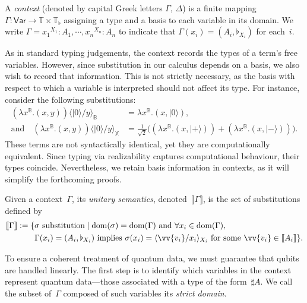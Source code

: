 \documentclass[runningheads,orivec,envcountsame,envcountsect]{llncs}
\newcommand\ket[1]{\ensuremath{|#1\rangle}}
\newcommand\Var{\ensuremath{\mathsf{Var}}}
\newcommand\ansubst[2]{\ensuremath{\langle #1 \rangle_{#2}}}
\newcommand\dom[1]{\mathrm{dom}(#1)}
\def\Pair#1#2{(#1,#2)} %
\def\Lam#1#2#3{\lambda#1^{#2}{.}#3} %
\def\Type{\mathbb{T}}
\def\BasisType{\Type_\flat}
\def\sem#1{\llbracket#1\rrbracket}
\newcommand\B{\mathbb B}
\newcommand\XB{\mathbb X}
\newcommand\basis[1]{\ensuremath{\flat_{#1}}}
\begin{document}
\begin{definition}
  A \emph{context} (denoted by capital Greek letters $\Gamma$, $\Delta$) is a
  finite mapping $\Gamma:\Var\to\Type\times\BasisType$ assigning a type and a
  basis to each variable in its domain. We write
  \(
    \Gamma = {x_1}^{{X_1}}:A_1,\dotsb, {x_n}^{{X_n}}:A_n
  \)
  to indicate that $\Gamma(x_i)=(A_i,\basis{X_i})$ for each~$i$.
\end{definition}

As in standard typing judgements, the context records the types of a term's
free variables. However, since substitution in our calculus depends on a basis,
we also wish to record that information. This is not strictly necessary, as the
basis with respect to which a variable is interpreted should not affect its
type. For instance, consider the following substitutions:
\begin{align*}
(\Lam{x}{\B}{\Pair{x}{y}})\ansubst{\ket{0}/y}{\B}
  &= \Lam{x}{\B}{\Pair{x}{\ket{0}}},\\
\text{and}\quad
(\Lam{x}{\B}{(x, y)})\ansubst{\ket{0}/y}{\XB}
  &= \tfrac{1}{\sqrt{2}}
    \bigl((\Lam{x}{\B}{\Pair{x}{\ket{+}}})
         + (\Lam{x}{\B}{\Pair{x}{\ket{-}}})\bigr).
\end{align*}
These terms are not syntactically identical, yet they are computationally
equivalent. 
Since typing via realizability captures computational behaviour,
their types coincide. Nevertheless, we retain basis information in contexts, as
it will simplify the forthcoming proofs.

\begin{definition}
  Given a context~$\Gamma$, its \emph{unitary semantics},
  denoted~$\sem{\Gamma}$, is the set of substitutions defined by
  \begin{align*}
    \sem{\Gamma}
    := 
    \{&\sigma~\text{substitution} \mid 
      \dom{\sigma} = \dom{\Gamma}
      \text{ and } \forall {x_i} \in \dom{\Gamma},\\
      &\Gamma(x_i) = (A_i, \basis{X_i})
      \text{ implies }
      \sigma(x_i) = \ansubst{\vv{v_i}/x_i}{{X_i}}
      \text{ for some }\vv{v_i} \in \sem{A_i}\}.
  \end{align*}
\end{definition}


To ensure a coherent treatment of quantum data, we must guarantee that qubits
are handled linearly. The first step is to identify which variables in the
context represent quantum data---those associated with a type of the
form~$\sharp A$. We call the subset of~$\Gamma$ composed of such variables its
\emph{strict domain}.
\end{document}
